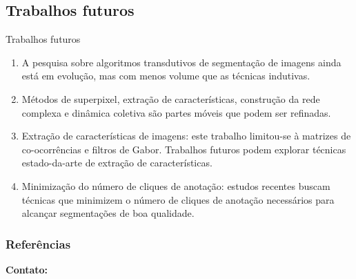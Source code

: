 \documentclass{templatebeamerufc/libs/ufc_format}
\begin{document}
\subsection{Trabalhos futuros}

\begin{frame}{Trabalhos futuros}
  \begin{enumerate}[<+->]
  \item A pesquisa sobre algoritmos transdutivos de segmentação de
imagens ainda está em evolução, mas com menos volume que as técnicas
indutivas.

  \item Métodos de superpixel, extração de características, construção
da rede complexa e dinâmica coletiva são partes móveis que podem ser
refinadas.

  \item Extração de características de imagens: este trabalho
limitou-se à matrizes de co-ocorrências e filtros de Gabor. Trabalhos
futuros podem explorar técnicas estado-da-arte de extração de
características.

  \item Minimização do número de cliques de anotação: estudos recentes
buscam técnicas que minimizem o número de cliques de anotação
necessários para alcançar segmentações de boa qualidade.


  \end{enumerate}
\end{frame}


\begin{frame}[allowframebreaks]
  \frametitle{Referências}
  
\end{frame}

\begin{frame}{}
    \centering
    \huge{\textbf{}}

    \vspace{1cm}

    \Large{\textbf{Contato:}}
    \newline
    \vspace*{0.5cm}
    \large{}
\end{frame}
\end{document}
